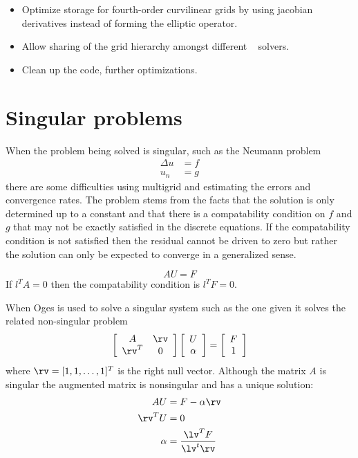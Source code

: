 \documentclass{article}
\begin{document}
\begin{itemize}
  \item Optimize storage for fourth-order curvilinear grids by using jacobian derivatives
        instead of forming the elliptic operator.
  \item Allow sharing of the grid hierarchy amongst different \Ogmg~ solvers.
  \item Clean up the code, further optimizations.
\end{itemize}




\clearpage
\section{Singular problems}

When the problem being solved is singular, such as the Neumann problem
\begin{align*}
   \Delta u & = f \\
   u_n & =g
\end{align*}
there are some difficulties using multigrid and estimating the errors and
convergence rates. The problem stems from the facts that the solution is
only determined up to a constant and that there is a compatability condition
on $f$ and $g$ that may not be exactly satisfied in the discrete equations. 
If the compatability condition is not satisfied then the residual cannot 
be driven to zero but rather the solution can only be expected to converge
in a generalized sense. 


$$
    A U = F 
$$
If $l^T A =0$ then the compatability condition is $l^TF=0$. 

     
When Oges is used to solve a singular system such as the one given
it solves the related non-singular problem
\begin{equation} \label{aug}
   \left[ \begin{array}{cc}
            A  & \rv  \\
          \rv^T &  0
           \end{array}\right]
   \left[ \begin{array}{c} U \\ \alpha  \end{array}\right]
 = \left[ \begin{array}{c} F \\ 1  \end{array}\right]
\end{equation}
where $\rv=[1,1,\ldots,1]^T$ is the right null vector.
Although the matrix $A$ is singular the augmented matrix
is nonsingular and has a unique solution:
\begin{align*}
   A U &= F - \alpha \rv \\
   \rv^T U &=0 \\
 \alpha &= { \lv^T F \over \lv^t\rv } 
\end{align*}
\end{document}
